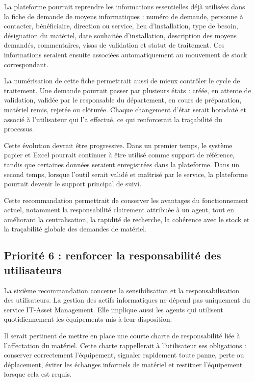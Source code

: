 \documentclass[12pt,a4paper]{report}
\begin{document}
La plateforme pourrait reprendre les informations essentielles déjà utilisées dans la fiche de demande de moyens informatiques : numéro de demande, personne à contacter, bénéficiaire, direction ou service, lieu d'installation, type de besoin, désignation du matériel, date souhaitée d'installation, description des moyens demandés, commentaires, visas de validation et statut de traitement. Ces informations seraient ensuite associées automatiquement au mouvement de stock correspondant.

La numérisation de cette fiche permettrait aussi de mieux contrôler le cycle de traitement. Une demande pourrait passer par plusieurs états : créée, en attente de validation, validée par le responsable du département, en cours de préparation, matériel remis, rejetée ou clôturée. Chaque changement d'état serait horodaté et associé à l'utilisateur qui l'a effectué, ce qui renforcerait la traçabilité du processus.

Cette évolution devrait être progressive. Dans un premier temps, le système papier et Excel pourrait continuer à être utilisé comme support de référence, tandis que certaines données seraient enregistrées dans la plateforme. Dans un second temps, lorsque l'outil serait validé et maîtrisé par le service, la plateforme pourrait devenir le support principal de suivi.

Cette recommandation permettrait de conserver les avantages du fonctionnement actuel, notamment la responsabilité clairement attribuée à un agent, tout en améliorant la centralisation, la rapidité de recherche, la cohérence avec le stock et la traçabilité globale des demandes de matériel.

\subsection{Priorité 6 : renforcer la responsabilité des utilisateurs}

La sixième recommandation concerne la sensibilisation et la responsabilisation des utilisateurs. La gestion des actifs informatiques ne dépend pas uniquement du service IT-Asset Management. Elle implique aussi les agents qui utilisent quotidiennement les équipements mis à leur disposition.

Il serait pertinent de mettre en place une courte charte de responsabilité liée à l'affectation du matériel. Cette charte rappellerait à l'utilisateur ses obligations : conserver correctement l'équipement, signaler rapidement toute panne, perte ou déplacement, éviter les échanges informels de matériel et restituer l'équipement lorsque cela est requis.
\end{document}
